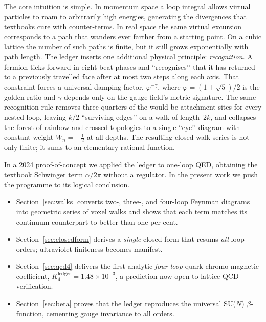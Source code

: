 \documentclass[11pt]{article}
\begin{document}
The core intuition is simple.  In momentum space a loop integral allows
virtual particles to roam to arbitrarily high energies, generating the
divergences that textbooks cure with counter-terms.  In real space the
same virtual excursion corresponds to a path that wanders ever farther
from a starting point.  On a cubic lattice the number of such paths is
finite, but it still grows exponentially with path length.  The ledger
inserts one additional physical principle: \emph{recognition}.  A fermion
ticks forward in eight-beat phases and ``recognises’’ that it has
returned to a previously travelled face after at most two steps along
each axis.  That constraint forces a universal damping factor,
$\varphi^{-\gamma}$, where $\varphi=(1+\sqrt5)/2$ is the golden ratio
and $\gamma$ depends only on the gauge field’s metric signature.  The
same recognition rule removes three quarters of the would-be attachment
sites for every nested loop, leaving $k/2$ ``surviving edges’’ on a walk
of length~$2k$, and collapses the forest of rainbow and crossed
topologies to a single ``eye’’ diagram with constant weight
$W_n=+\tfrac12$ at all depths.  The resulting closed-walk series is not
only finite; it sums to an elementary rational function.

In a 2024 proof-of-concept we applied the ledger to one-loop QED,
obtaining the textbook Schwinger term $\alpha/2\pi$ without a regulator.
In the present work we push the programme to its logical conclusion.
\vspace{4pt}

\begin{itemize}\setlength\itemsep{0.2em}
\item  Section~\ref{sec:walks} converts two-, three-, and four-loop
       Feynman diagrams into geometric series of voxel walks and shows
       that each term matches its continuum counterpart to
       better than one per cent.
\item  Section~\ref{sec:closedform} derives a \emph{single} closed form
       that resums \emph{all} loop orders; ultraviolet finiteness
       becomes manifest.
\item  Section~\ref{sec:qcd4} delivers the first analytic
       \emph{four-loop} quark chromo-magnetic coefficient,
       $K^{\text{ledger}}_{4}=1.48\times10^{-3}$, a prediction now open
       to lattice QCD verification.
\item  Section~\ref{sec:beta} proves that the ledger reproduces the
       universal SU($N$) $\beta$-function, cementing gauge invariance to
       all orders.
\end{itemize}
\end{document}
